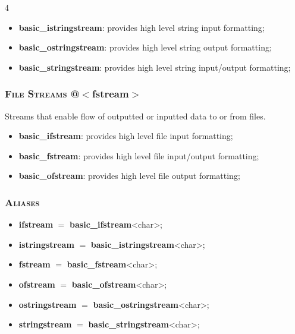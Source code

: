 \documentclass[10pt]{article}
\begin{document}
\begin{multicols*}{4}
{\begin{itemize}[leftmargin=*,topsep=0.25pt]
  \setlength\itemsep{-1.8pt}
	\item \textbf{basic\_istringstream}: provides high level string input formatting;
	\item \textbf{basic\_ostringstream}: provides high level string output formatting;
	\item \textbf{basic\_stringstream}: provides high level string input/output formatting;
\end{itemize}

\subsubsection*{\textsc{File Streams} @$<$fstream$>$} 
\noindent
Streams that enable flow of outputted or inputted data to or from files.

\begin{itemize}[leftmargin=*,topsep=0.25pt]
  \setlength\itemsep{-1.8pt}
	\item \textbf{basic\_ifstream}: provides high level file input formatting;
	\item \textbf{basic\_fstream}: provides high level file input/output formatting;
	\item \textbf{basic\_ofstream}: provides high level file output formatting;
\end{itemize}

\subsubsection*{\textsc{Aliases}} 
\begin{itemize}[leftmargin=*,topsep=0.25pt]
  \setlength\itemsep{-1.8pt}
  \item \textbf{ifstream} $=$ \textbf{basic\_ifstream}<char>;
  \item \textbf{istringstream} $=$ \textbf{basic\_istringstream}<char>;
  \item \textbf{fstream} $=$ \textbf{basic\_fstream}<char>;
  \item \textbf{ofstream} $=$ \textbf{basic\_ofstream}<char>;
  \item \textbf{ostringstream} $=$ \textbf{ba\-sic\_o\-string\-stream}\-<char>;
  \item \textbf{stringstream} $=$ \textbf{basic\_stringstream}<char>;
\end{itemize}


}
\end{multicols*}
\end{document}
